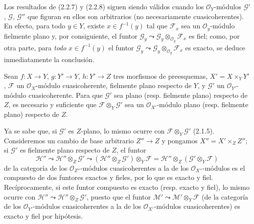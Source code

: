 \begin{remark}[2.2.9]
\label{IV.2.2.9-fr}
Los resultados de (2.2.7) y (2.2.8) siguen siendo válidos cuando los
$\mathcal O_Y$-módulos $\mathscr G'$, $\mathscr G$, $\mathscr G''$ que figuran
en ellos son arbitrarios (no necesariamente cuasicoherentes). En efecto,
para todo $y\in Y$, existe $x\in f^{-1}(y)$ tal que $\mathscr F_x$ sea un
$\mathcal O_y$-módulo
fielmente plano y, por consiguiente, el funtor
$\mathscr G_y\leadsto\mathscr G_y\otimes_{\mathcal O_y}\mathscr F_x$ es
fiel; como, por otra parte, para \emph{todo} $x\in f^{-1}(y)$ el funtor
$\mathscr G_y\leadsto\mathscr G_y\otimes_{\mathcal O_y}\mathscr F_x$ es
exacto, se deduce inmediatamente la conclusión.
\end{remark}

\begin{proposition}[2.2.10]
\label{IV.2.2.10-fr}
Sean $f:X\to Y$, $g:Y'\to Y$, $h:Y'\to Z$ tres morfismos de preesquemas,
$X'=X\times_Y Y'$, $\mathscr F$ un $\mathcal O_X$-módulo cuasicoherente,
fielmente plano respecto de $Y$, y $\mathscr G'$ un
$\mathcal O_{Y'}$-módulo cuasicoherente. Para que $\mathscr G'$ sea plano
\textup{(resp.} fielmente plano) respecto de $Z$, es necesario y suficiente que
$\mathscr F\otimes_Y\mathscr G'$ sea un $\mathcal O_{X'}$-módulo plano
\textup{(resp.} fielmente plano) respecto de $Z$.
\end{proposition}

Ya se sabe que, si $\mathscr G'$ es $Z$-plano, lo mismo ocurre con
$\mathscr F\otimes_Y\mathscr G'$ (2.1.5). Consideremos un cambio de base
arbitrario $Z''\to Z$ y pongamos $X''=X'\times_Z Z''$; si $\mathscr G'$ es
fielmente plano respecto de $Z$, el funtor
\begin{equation}
\tag{2.2.10.1}
\label{IV.2.2.10.1-fr}
\mathscr H''\leadsto\mathscr H''\otimes_Z\mathscr G'
\leadsto(\mathscr H''\otimes_Z\mathscr G')\otimes_Y\mathscr F
=\mathscr H''\otimes_Z(\mathscr G'\otimes_Y\mathscr F)
\end{equation}
de la categoría de los $\mathcal O_{Z''}$-módulos cuasicoherentes a la de
los $\mathcal O_{X''}$-módulos es el compuesto de dos funtores exactos y
fieles, por lo que es exacto y fiel. Recíprocamente, si este funtor compuesto
es exacto (resp. exacto y fiel), lo mismo ocurre con
$\mathscr H''\leadsto\mathscr H''\otimes_Z\mathscr G'$, puesto que el funtor
$\mathscr M'\leadsto\mathscr M'\otimes_Y\mathscr F$ (de la categoría de los
$\mathcal O_{Y'}$-módulos cuasicoherentes a la de los
$\mathcal O_{X'}$-módulos cuasicoherentes) es exacto y fiel por hipótesis.

